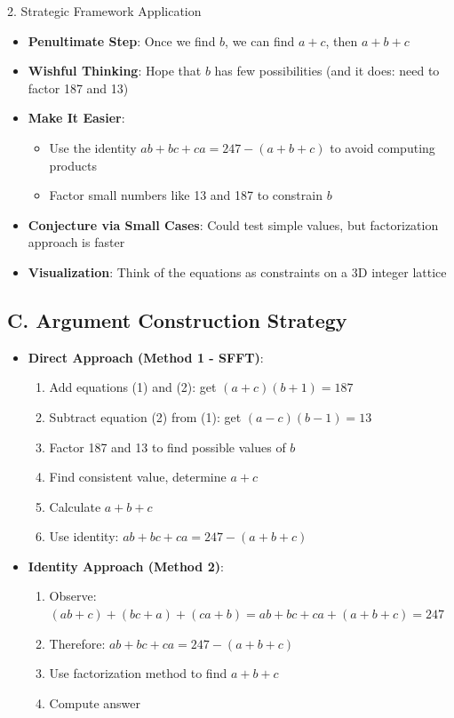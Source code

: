 \documentclass[12pt]{article}
\begin{document}
\begin{strategybox}{2. Strategic Framework Application}
\begin{itemize}[leftmargin=*]
    \item \textbf{Penultimate Step}: Once we find $b$, we can find $a+c$, then $a+b+c$
    
    \item \textbf{Wishful Thinking}: Hope that $b$ has few possibilities (and it does: need to factor 187 and 13)
    
    \item \textbf{Make It Easier}: 
    \begin{itemize}
        \item Use the identity $ab+bc+ca = 247 - (a+b+c)$ to avoid computing products
        \item Factor small numbers like 13 and 187 to constrain $b$
    \end{itemize}
    
    \item \textbf{Conjecture via Small Cases}: Could test simple values, but factorization approach is faster
    
    \item \textbf{Visualization}: Think of the equations as constraints on a 3D integer lattice
\end{itemize}

\subsection*{C. Argument Construction Strategy}
\begin{itemize}[leftmargin=*]
    \item \textbf{Direct Approach (Method 1 - SFFT)}: 
    \begin{enumerate}
        \item Add equations (1) and (2): get $(a+c)(b+1) = 187$
        \item Subtract equation (2) from (1): get $(a-c)(b-1) = 13$
        \item Factor 187 and 13 to find possible values of $b$
        \item Find consistent value, determine $a+c$
        \item Calculate $a+b+c$
        \item Use identity: $ab+bc+ca = 247 - (a+b+c)$
    \end{enumerate}
    
    \item \textbf{Identity Approach (Method 2)}:
    \begin{enumerate}
        \item Observe: $(ab+c) + (bc+a) + (ca+b) = ab + bc + ca + (a+b+c) = 247$
        \item Therefore: $ab+bc+ca = 247 - (a+b+c)$
        \item Use factorization method to find $a+b+c$
        \item Compute answer
    \end{enumerate}
    

\end{itemize}
\end{strategybox}
\end{document}
